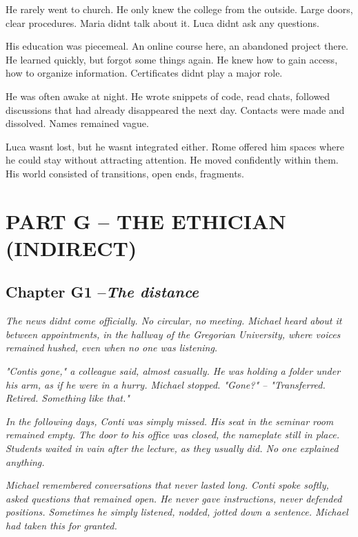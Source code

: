 \documentclass[
]{article}
\begin{document}
He rarely went to church. He only knew the college from the outside. Large doors, clear procedures. Maria didn\textquotesingle t talk about it. Luca didn\textquotesingle t ask any questions.

His education was piecemeal. An online course here, an abandoned project there. He learned quickly, but forgot some things again. He knew how to gain access, how to organize information. Certificates didn\textquotesingle t play a major role.

He was often awake at night. He wrote snippets of code, read chats, followed discussions that had already disappeared the next day. Contacts were made and dissolved. Names remained vague.

Luca wasn\textquotesingle t lost, but he wasn\textquotesingle t integrated either. Rome offered him spaces where he could stay without attracting attention. He moved confidently within them. His world consisted of transitions, open ends, fragments.

\section{PART G -- THE ETHICIAN (INDIRECT)}\label{part-g-the-ethician-indirect}

\subsection{\texorpdfstring{Chapter G1 --\emph{The distance}}{Chapter G1 --The distance}}\label{chapter-g1-the-distance}

\emph{The news didn\textquotesingle t come officially. No circular, no meeting. Michael heard about it between appointments, in the hallway of the Gregorian University, where voices remained hushed, even when no one was listening.}

\emph{"Conti\textquotesingle s gone," a colleague said, almost casually. He was holding a folder under his arm, as if he were in a hurry. Michael stopped. "Gone?" -- "Transferred. Retired. Something like that."}

\emph{In the following days, Conti was simply missed. His seat in the seminar room remained empty. The door to his office was closed, the nameplate still in place. Students waited in vain after the lecture, as they usually did. No one explained anything.}

\emph{Michael remembered conversations that never lasted long. Conti spoke softly, asked questions that remained open. He never gave instructions, never defended positions. Sometimes he simply listened, nodded, jotted down a sentence. Michael had taken this for granted.}
\end{document}
